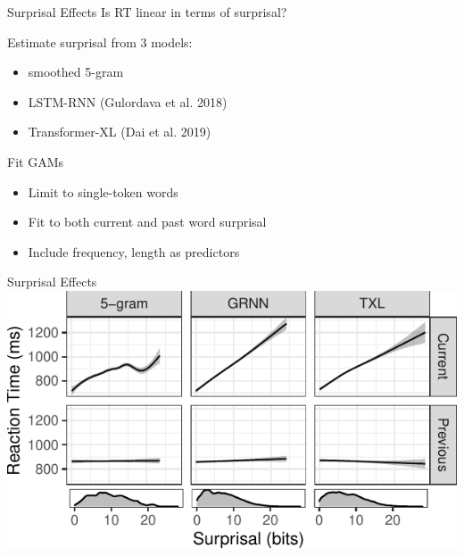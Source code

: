 \documentclass[12pt, xcolor=beamer,table,usenames,dvipsnames, ignorenonframetext, ngerman,t]{beamer}
\begin{document}
\begin{frame}{Surprisal Effects}
\large{Is RT linear in terms of surprisal?}\pause
\medskip

Estimate surprisal from 3 models:
\begin{itemize}
	\item smoothed 5-gram
	\item LSTM-RNN (Gulordava et al. 2018)
	\item Transformer-XL (Dai et al. 2019)
\end{itemize}

\pause

Fit GAMs
\begin{itemize}
	\item Limit to single-token words
	\item Fit to both current and past word surprisal
	\item Include frequency, length as predictors
\end{itemize}

\end{frame}

\begin{frame}{Surprisal Effects}
	\includegraphics[width=.9\textwidth]{../gam.pdf}	
\end{frame}
\end{document}
